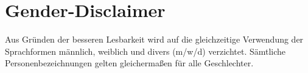 \chapter*{Gender-Disclaimer}
Aus Gründen der besseren Lesbarkeit wird auf die gleichzeitige Verwendung der Sprachformen männlich, weiblich und divers (m/w/d) verzichtet. Sämtliche Personenbezeichnungen gelten gleichermaßen für alle Geschlechter.
